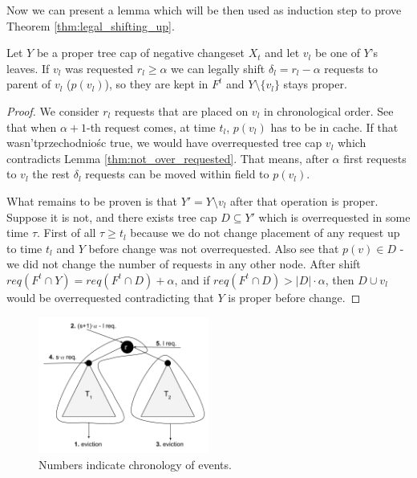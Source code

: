 Now we can present a lemma which will be then used as induction step to prove 
Theorem \ref{thm:legal_shifting_up}.
\begin{lemma}
 Let $Y$ be a proper tree cap of negative changeset $X_t$ and let $v_l$ be one 
of $Y$'s leaves. If $v_l$ was requested $r_l \geq \alpha$ we can legally shift  
$\delta_l = r_l - \alpha$ requests to parent of $v_l$ ($p(v_l)$), so they are 
kept in $F^t$ and $Y \setminus \{v_l\}$ stays proper. 
\end{lemma}
\begin{proof}
We consider $r_l$ requests that are placed on $v_l$ in chronological order. See 
that when $\alpha + 1$-th request comes, at time $t_l$, $p(v_l)$ has to be in 
cache. If that wasn'tprzechodniośc true, we would have overrequested tree cap 
${v_l}$ which 
contradicts Lemma \ref{thm:not_over_requested}. That means, after $\alpha$ first 
requests to $v_l$ the rest $\delta_l$ requests can be moved within field to 
$p(v_l)$.

What remains to be proven is that $Y' = Y \setminus {v_l}$ after that operation 
is proper. Suppose it is not, and there exists tree cap $D \subseteq Y'$ which 
is overrequested in some time $\tau$. First of all $\tau \geq t_l$ because we 
do not change placement of any request up to time $t_l$ and $Y$ before change 
was not overrequested. Also see that $p(v) \in D$ - we did not change the 
number of requests in any other node. After shift $req(F^t \cap Y) = req(F^t 
\cap D) + \alpha$, and if $req(F^t \cap D) > |D| \cdot \alpha$, then $D \cup 
v_l$ would be overrequested contradicting that $Y$ is proper before change.
\end{proof}
\begin{figure}
\vspace{-20pt}
 \begin{center}
  \includegraphics[width=0.5\textwidth]{example_not_even.png}
\end{center}
\caption{Numbers indicate chronology of events.}
\vspace{-20pt}
\label{fig:example_not_even}
\end{figure}
